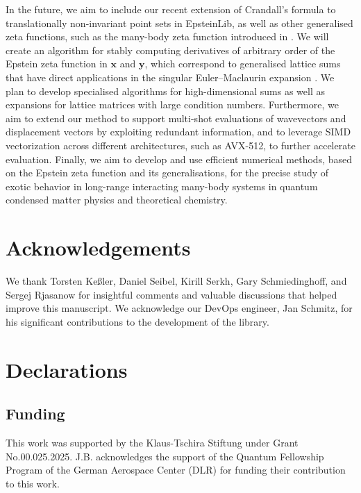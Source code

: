 \documentclass[]{amsart}
\newcommand{\new}[1]{#1}
\numberwithin{mythm}{section}
\begin{document}
In the future, we aim to include our  recent extension of Crandall's formula to translationally non-invariant point sets
\cite{buchheitComputationLatticeSums2024} 
in EpsteinLib, as well as other generalised zeta functions, such as the many-body zeta function introduced in \cite{buchheitEpsteinZetaMethod2025}.
We will create an algorithm for stably computing derivatives of arbitrary order of the Epstein zeta function in \(\bm x\) and $\bm y$, which correspond to generalised lattice sums \cite{buchheit2022singular} that have direct applications in the singular Euler--Maclaurin expansion \cite{buchheit2023exact}.
We plan to develop specialised algorithms for high-dimensional sums as well as expansions for lattice matrices with large condition numbers. \new{Furthermore, we aim to extend our method to support multi-shot evaluations of wavevectors and displacement vectors by exploiting redundant information, and to leverage SIMD vectorization across different architectures, such as AVX-512, to further accelerate evaluation.}
Finally,
we aim to develop and use efficient numerical methods, based on the Epstein zeta function and its generalisations,
for the precise study of exotic behavior in long-range interacting many-body systems in quantum condensed matter physics and theoretical chemistry.


\section*{Acknowledgements}

We thank Torsten Keßler, Daniel Seibel, Kirill Serkh, Gary Schmiedinghoff, and Sergej Rjasanow for insightful comments and valuable discussions that helped improve this manuscript. 
We acknowledge our DevOps engineer, Jan Schmitz, for his significant contributions to the development of the library.



\section*{Declarations}


\subsection*{Funding}
\new{This work was supported by the Klaus-Tschira Stiftung under Grant No.00.025.2025.}
J.B. acknowledges the support of the Quantum Fellowship Program of the German Aerospace Center (DLR) for funding their contribution to this work.
\end{document}

